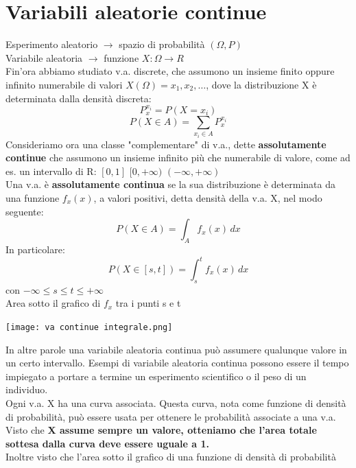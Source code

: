 \documentclass[12pt, a4paper, openany]{book}
\begin{document}
\section{Variabili aleatorie continue}
Esperimento aleatorio $\to$ spazio di probabilità $(\Omega, P)$
\\ Variabile aleatoria $\to$ funzione $X:\Omega \to R$
\\Fin'ora abbiamo studiato v.a. discrete, che assumono un insieme finito oppure
infinito numerabile di valori $X(\Omega) = {x_1, x_2, \dots}$, dove la distribuzione
X è determinata dalla densità discreta:
\begin{equation*}
    P_x^{x_i} = P(X=x_i)
\end{equation*}
\begin{equation}
    P(X \in A) = \sum_{x_i \in A}P_x^{x_i}  
\end{equation}
Consideriamo ora una classe "complementare" di v.a., dette \textbf{assolutamente continue}
che assumono un insieme infinito più che numerabile di valore, come ad es. un intervallo
di R: $[0, 1]$ $[0, +\infty)$ $(-\infty, +\infty)$
\\ Una v.a. è \textbf{assolutamente continua} se la sua distribuzione è determinata
da una funzione $f_x(x)$, a valori positivi, detta densità della v.a. X, nel modo
seguente:
\begin{equation*}
    P(X \in A) = \int_{A}f_x (x) \,dx 
\end{equation*}
In particolare:
\begin{equation*}
    P(X\in[s,t]) = \int_{s}^{t} f_x (x)\,dx 
\end{equation*}
con $-\infty \leq s \leq t \leq +\infty$
\\Area sotto il grafico di $f_x$ tra i punti s e t
\begin{center}
    \texttt{[image: va continue integrale.png]}
\end{center}
In altre parole una variabile aleatoria continua può assumere qualunque valore in un
certo intervallo. Esempi di variabile aleatoria continua possono essere il tempo impiegato a
portare a termine un esperimento scientifico o il peso di un individuo.
\\ Ogni v.a. X ha una curva associata. Questa curva, nota come funzione di densità
di probabilità, può essere usata per ottenere le probabilità associate a una v.a.
\\ Visto che \textbf{X assume sempre un valore, otteniamo che l'area totale sottesa dalla curva
deve essere uguale a 1.}
\\ Inoltre visto che l'area sotto il grafico di una funzione di densità di probabilità
\end{document}
